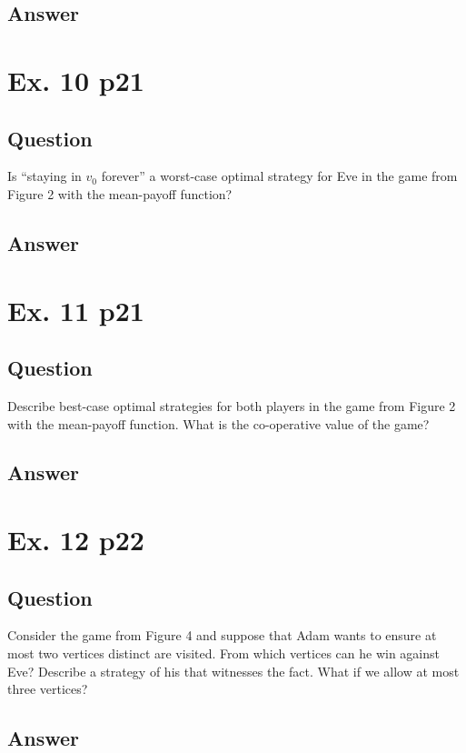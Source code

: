 \documentclass[12pt]{article}
\begin{document}
\subsection{Answer}


\section{Ex. 10 p21}
\subsection{Question}
Is ``staying in $v_0$ forever''
a worst-case optimal strategy for Eve
in the game from Figure 2 with the
mean-payoff function?

\subsection{Answer}


\section{Ex. 11 p21}
\subsection{Question}
Describe best-case optimal strategies for both players in the game from Figure 2 with the mean-payoff function. What is the co-operative value of the game?

\subsection{Answer}


\section{Ex. 12 p22}
\subsection{Question}
Consider the game from Figure 4 and suppose that Adam wants to ensure at most two vertices distinct are visited. From which vertices can he win against Eve? Describe a strategy of his that witnesses the fact. What if we allow at most three vertices?

\subsection{Answer}
\end{document}
